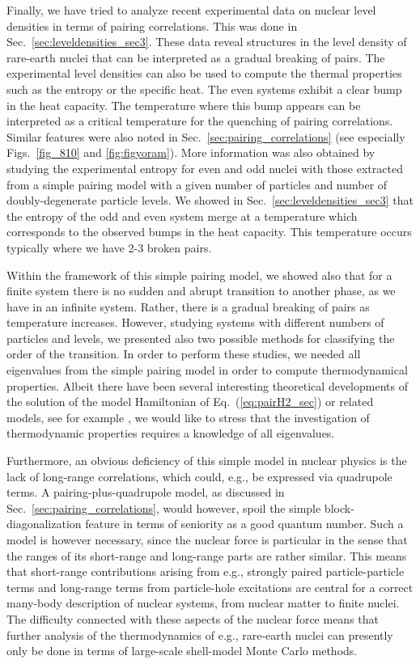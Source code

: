 \documentclass[rmp,aps,floatfix]{revtex4}
\begin{document}
Finally, we have tried to analyze recent experimental data on nuclear level
densities in terms of pairing correlations. This was done in 
Sec.~\ref{sec:leveldensities_sec3}. These data reveal structures in the level
density of rare-earth nuclei that can be interpreted as a gradual breaking
of pairs. The experimental level densities can also be used to compute the 
thermal properties such as the entropy or the specific heat.
The even systems exhibit a clear bump in the heat capacity. The temperature
where this bump appears can be interpreted as a critical temperature 
for the quenching of pairing correlations. Similar features were also noted in
Sec.~\ref{sec:pairing_correlations} (see especially Figs.~\ref{fig_810} and 
\ref{fig:figyoram}).
More information was also obtained by studying the 
experimental entropy for even and odd nuclei with those
extracted from a simple pairing model with a given number of particles 
and number of doubly-degenerate particle levels. We showed in 
Sec.~\ref{sec:leveldensities_sec3} that the entropy of the odd and even system
merge at a temperature which corresponds to the observed bumps in the 
heat capacity. This temperature occurs typically where we have 2-3 
broken pairs.

Within the framework of this simple pairing model, we 
showed also that for a finite system there is no sudden and abrupt transition
to another phase, as we have in an infinite system. Rather, there is a
gradual breaking of pairs as temperature increases. However, studying
systems with different numbers of particles and levels, we 
presented also two 
possible methods for classifying the order of the transition. 
In order to perform these studies, we needed all eigenvalues
from the simple pairing model in order to compute thermodynamical
properties. 
Albeit there have been several interesting theoretical developments
of the solution of the model Hamiltonian of Eq.~(\ref{eq:pairH2_sec})
or related models,
see for example 
\cite{richardson2002,dukelsky2002,volya_1,volya_3}, we would like to 
stress that the investigation of thermodynamic properties requires a
knowledge of all eigenvalues. 

Furthermore, an obvious deficiency of this simple model in nuclear physics
is the lack of long-range correlations, which could, e.g., 
be expressed via quadrupole terms. A pairing-plus-quadrupole model,
as discussed in  Sec.~\ref{sec:pairing_correlations}, would however, spoil
the simple block-diagonalization feature in terms of seniority as a good 
quantum number. Such a model is however necessary, since the nuclear force
is particular in the sense that the ranges of its short-range and long-range
parts are rather similar. This means that short-range contributions arising
from e.g., strongly paired particle-particle terms and 
long-range terms from particle-hole excitations  
are central for a correct many-body
description of nuclear systems, from nuclear matter to finite nuclei. 
The difficulty connected with these aspects of the nuclear force means
that further 
analysis of the thermodynamics of e.g.,
rare-earth nuclei can presently only be done  
in terms of large-scale shell-model Monte Carlo methods.
\end{document}
